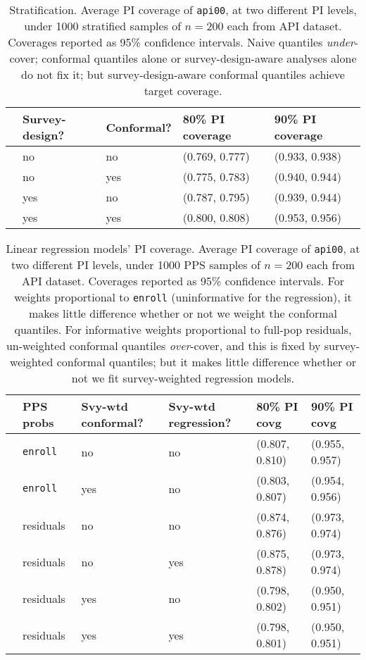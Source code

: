 \documentclass[10.5pt, letterpaper]{article}
\numberwithin{table}{section}
\numberwithin{figure}{section}
\numberwithin{equation}{section}
\begin{document}
\begin{table}[ht!]
\centering
\begin{tabular}{rllll}
  \hline
 & Survey-design? & Conformal? & 80\% PI coverage & 90\% PI coverage \\
  \hline
  & no & no & (0.769, 0.777) & (0.933, 0.938) \\
  & no & yes & (0.775, 0.783) & (0.940, 0.944) \\
  & yes & no & (0.787, 0.795) & (0.939, 0.944) \\
  & yes & yes & (0.800, 0.808) & (0.953, 0.956) \\
   \hline
\end{tabular}
\caption{Stratification. Average PI coverage of \texttt{api00}, at two different PI levels, under 1000 stratified samples of $n=200$ each from API dataset. Coverages reported as 95\% confidence intervals. Naive quantiles \emph{under}-cover; conformal quantiles alone or survey-design-aware analyses alone do not fix it; but survey-design-aware conformal quantiles achieve target coverage.}
\label{table:strat}
\end{table}



\begin{table}[ht!]
\centering
\begin{tabular}{rlllll}
  \hline
  & PPS probs & Svy-wtd conformal? & Svy-wtd regression? & 80\% PI covg & 90\% PI covg \\
  \hline
  & \texttt{enroll} & no & no & (0.807, 0.810) & (0.955, 0.957) \\
  & \texttt{enroll} & yes & no & (0.803, 0.807) & (0.954, 0.956) \\
  \hline
  & residuals & no & no & (0.874, 0.876) & (0.973, 0.974) \\
  & residuals & no & yes & (0.875, 0.878) & (0.973, 0.974) \\
  & residuals & yes & no & (0.798, 0.802) & (0.950, 0.951) \\
  & residuals & yes & yes & (0.798, 0.801) & (0.950, 0.951) \\
  \hline
\end{tabular}
\caption{Linear regression models' PI coverage. Average PI coverage of \texttt{api00}, at two different PI levels, under 1000 PPS samples of $n=200$ each from API dataset. Coverages reported as 95\% confidence intervals. For weights proportional to \texttt{enroll} (uninformative for the regression), it makes little difference whether or not we weight the conformal quantiles. For informative weights proportional to full-pop residuals, un-weighted conformal quantiles \emph{over}-cover, and this is fixed by survey-weighted conformal quantiles; but it makes little difference whether or not we fit survey-weighted regression models.}
\label{table:model_covg}
\end{table}
\end{document}
